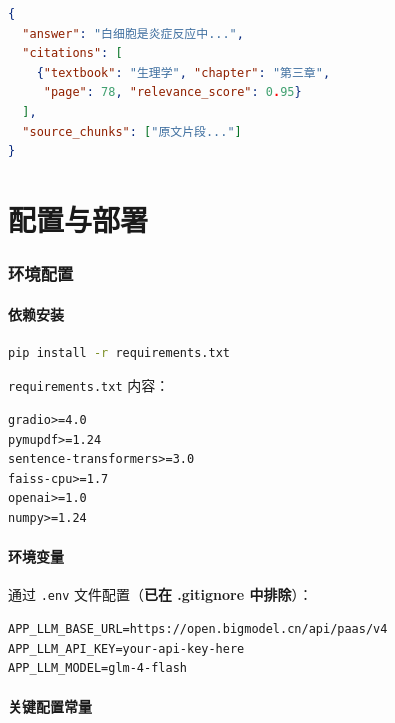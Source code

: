 \documentclass[12pt,a4paper]{article}
\begin{document}
\begin{lstlisting}[language=JSON, title={RAG Response}]
{
  "answer": "白细胞是炎症反应中...",
  "citations": [
    {"textbook": "生理学", "chapter": "第三章",
     "page": 78, "relevance_score": 0.95}
  ],
  "source_chunks": ["原文片段..."]
}
\end{lstlisting}


\newpage
\part{配置与部署}

\section{环境配置}

\subsection{依赖安装}

\begin{lstlisting}[language=bash, title={安装依赖}]
pip install -r requirements.txt
\end{lstlisting}

\texttt{requirements.txt} 内容：

\begin{lstlisting}[language={}, title={requirements.txt}]
gradio>=4.0
pymupdf>=1.24
sentence-transformers>=3.0
faiss-cpu>=1.7
openai>=1.0
numpy>=1.24
\end{lstlisting}

\subsection{环境变量}

通过 \texttt{.env} 文件配置（\textbf{已在 .gitignore 中排除}）：

\begin{lstlisting}[language={}, title={.env 配置}]
APP_LLM_BASE_URL=https://open.bigmodel.cn/api/paas/v4
APP_LLM_API_KEY=your-api-key-here
APP_LLM_MODEL=glm-4-flash
\end{lstlisting}

\subsection{关键配置常量}
\end{document}
